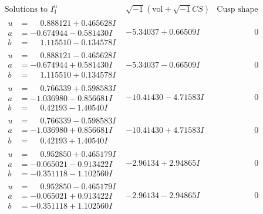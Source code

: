 \documentclass[1p]{elsarticle_modified}
\theoremstyle{definition}
\newcommand{\I}{\sqrt{-1}}
\begin{document}
$$\begin{array}{c|c|c}  
\text{Solutions to }I^u_{1}& \I (\text{vol} + \sqrt{-1}CS) & \text{Cusp shape}\\
 \hline 
\begin{aligned}
u &= \phantom{-}0.888121 + 0.465628 I \\
a &= -0.674944 - 0.581430 I \\
b &= \phantom{-}1.115510 - 0.134578 I\end{aligned}
 & -5.34037 + 0.66509 I & \phantom{-0.000000 } 0 \\ \hline\begin{aligned}
u &= \phantom{-}0.888121 - 0.465628 I \\
a &= -0.674944 + 0.581430 I \\
b &= \phantom{-}1.115510 + 0.134578 I\end{aligned}
 & -5.34037 - 0.66509 I & \phantom{-0.000000 } 0 \\ \hline\begin{aligned}
u &= \phantom{-}0.766339 + 0.598583 I \\
a &= -1.036980 - 0.856681 I \\
b &= \phantom{-}0.42193 - 1.40540 I\end{aligned}
 & -10.41430 - 4.71583 I & \phantom{-0.000000 } 0 \\ \hline\begin{aligned}
u &= \phantom{-}0.766339 - 0.598583 I \\
a &= -1.036980 + 0.856681 I \\
b &= \phantom{-}0.42193 + 1.40540 I\end{aligned}
 & -10.41430 + 4.71583 I & \phantom{-0.000000 } 0 \\ \hline\begin{aligned}
u &= \phantom{-}0.952850 + 0.465179 I \\
a &= -0.065021 - 0.913422 I \\
b &= -0.351118 - 1.102560 I\end{aligned}
 & -2.96134 + 2.94865 I & \phantom{-0.000000 } 0 \\ \hline\begin{aligned}
u &= \phantom{-}0.952850 - 0.465179 I \\
a &= -0.065021 + 0.913422 I \\
b &= -0.351118 + 1.102560 I\end{aligned}
 & -2.96134 - 2.94865 I & \phantom{-0.000000 } 0 \\ \hline\begin{aligned}

\end{aligned}
\end{array}$$
\end{document}

